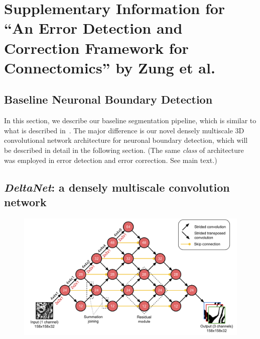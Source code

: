 \documentclass{article}
\begin{document}
\section*{Supplementary Information for ``An Error Detection and Correction Framework for Connectomics'' by Zung et al.}

\begin{appendices}

\section{Baseline Neuronal Boundary Detection}
\label{appendix:baseline}

In this section, we describe our baseline segmentation pipeline, which is
similar to what is described in~\cite{kisuk}. The major difference is our novel
densely multiscale 3D convolutional network architecture for neuronal boundary
detection, which will be described in detail in the following section. (The same
\emph{class} of architecture was employed in error detection and error
correction. See main text.)

\subsection{\textsl{DeltaNet}: a densely multiscale convolution network}
\label{sec:deltanet}

\begin{figure}[!b]
\centering
\includegraphics[width=1.0\linewidth]{baseline.pdf}


\end{figure}
\end{appendices}
\end{document}

